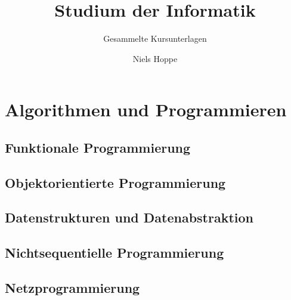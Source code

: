 

\title{Studium der Informatik}
\subtitle{Gesammelte Kursunterlagen}
\author{Niels Hoppe}



\maketitle
\tableofcontents

\part{Algorithmen und Programmieren}
\chapter{Funktionale Programmierung}
\chapter{Objektorientierte Programmierung}
\chapter{Datenstrukturen und Datenabstraktion}

\chapter{Nichtsequentielle Programmierung}
\chapter{Netzprogrammierung}


